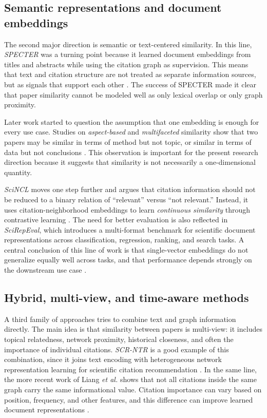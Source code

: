 \documentclass[11pt]{article}
\begin{document}
\subsection{Semantic representations and document embeddings}

The second major direction is semantic or text-centered similarity. In this line, \emph{SPECTER} was a turning point because it learned document embeddings from titles and abstracts while using the citation graph as supervision. This means that text and citation structure are not treated as separate information sources, but as signals that support each other \cite{cohan2020specter}. The success of SPECTER made it clear that paper similarity cannot be modeled well as only lexical overlap or only graph proximity.

Later work started to question the assumption that one embedding is enough for every use case. Studies on \emph{aspect-based} and \emph{multifaceted} similarity show that two papers may be similar in terms of method but not topic, or similar in terms of data but not conclusions \cite{ostendorff2020aspect,risch2021multifaceted}. This observation is important for the present research direction because it suggests that similarity is not necessarily a one-dimensional quantity.

\emph{SciNCL} moves one step further and argues that citation information should not be reduced to a binary relation of ``relevant'' versus ``not relevant.'' Instead, it uses citation-neighborhood embeddings to learn \emph{continuous similarity} through contrastive learning \cite{ostendorff2022scincl}. The need for better evaluation is also reflected in \emph{SciRepEval}, which introduces a multi-format benchmark for scientific document representations across classification, regression, ranking, and search tasks. A central conclusion of this line of work is that single-vector embeddings do not generalize equally well across tasks, and that performance depends strongly on the downstream use case \cite{singh2023scirepeval}.

\subsection{Hybrid, multi-view, and time-aware methods}

A third family of approaches tries to combine text and graph information directly. The main idea is that similarity between papers is multi-view: it includes topical relatedness, network proximity, historical closeness, and often the importance of individual citations. \emph{SCR-NTR} is a good example of this combination, since it joins text encoding with heterogeneous network representation learning for scientific citation recommendation \cite{qiu2021scrntr}. In the same line, the more recent work of Liang \emph{et al.} shows that not all citations inside the same graph carry the same informational value. Citation importance can vary based on position, frequency, and other features, and this difference can improve learned document representations \cite{liang2026citation}.
\end{document}
